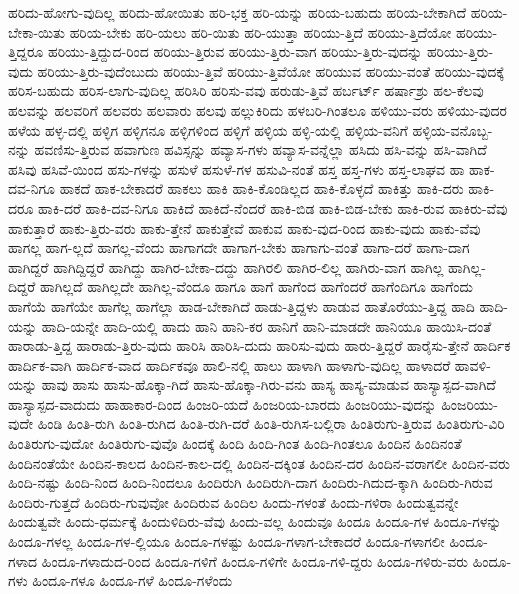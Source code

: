 {ಹರಿದು-ಹೋಗು-ವುದಿಲ್ಲ
ಹರಿದು-ಹೋಯಿತು
ಹರಿ-ಭಕ್ತ
ಹರಿ-ಯನ್ನು
ಹರಿಯ-ಬಹುದು
ಹರಿಯ-ಬೇಕಾಗಿದೆ
ಹರಿಯ-ಬೇಕಾ-ಯಿತು
ಹರಿಯ-ಬೇಕು
ಹರಿ-ಯಲು
ಹರಿ-ಯಿತು
ಹರಿ-ಯುತ್ತಾ
ಹರಿಯು-ತ್ತಿದೆ
ಹರಿಯು-ತ್ತಿದೆಯೋ
ಹರಿಯು-ತ್ತಿದ್ದರೂ
ಹರಿಯು-ತ್ತಿದ್ದುದ-ರಿಂದ
ಹರಿಯು-ತ್ತಿರುವ
ಹರಿಯು-ತ್ತಿರು-ವಾಗ
ಹರಿಯು-ತ್ತಿರು-ವುದನ್ನು
ಹರಿಯು-ತ್ತಿರು-ವುದು
ಹರಿಯು-ತ್ತಿರು-ವುದೆಂಬುದು
ಹರಿಯು-ತ್ತಿವೆ
ಹರಿಯು-ತ್ತಿವೆಯೋ
ಹರಿಯುವ
ಹರಿಯು-ವಂತೆ
ಹರಿಯು-ವುದಕ್ಕೆ
ಹರಿಸ-ಬಹುದು
ಹರಿಸ-ಲಾಗು-ವುದಿಲ್ಲ
ಹರಿಸಿರಿ
ಹರಿಸು-ವವು
ಹರುಡು-ತ್ತಿವೆ
ಹರ್ಬರ್ಟ್
ಹರ್ಷಾಶ್ರು
ಹಲ-ಕೆಲವು
ಹಲವನ್ನು
ಹಲವರಿಗೆ
ಹಲವರು
ಹಲವಾರು
ಹಲವು
ಹಲ್ಲುಕಿರಿದು
ಹಳಬರಿ-ಗಿಂತಲೂ
ಹಳಿಯು-ವರು
ಹಳಿಯು-ವುದರ
ಹಳೆಯ
ಹಳ್ಳ-ದಲ್ಲಿ
ಹಳ್ಳಿಗ
ಹಳ್ಳಿಗನೂ
ಹಳ್ಳಿಗಳಿಂದ
ಹಳ್ಳಿಗೆ
ಹಳ್ಳಿಯ
ಹಳ್ಳಿ-ಯಲ್ಲಿ
ಹಳ್ಳಿಯ-ವನಿಗೆ
ಹಳ್ಳಿಯ-ವನೊಬ್ಬ-ನನ್ನು
ಹವಣಿಸು-ತ್ತಿರುವ
ಹವಾಗುಣ
ಹವಿಸ್ಸನ್ನು
ಹವ್ಯಾಸ-ಗಳು
ಹವ್ಯಾಸ-ವನ್ನೆಲ್ಲಾ
ಹಸಿದು
ಹಸಿ-ವನ್ನು
ಹಸಿ-ವಾಗಿದೆ
ಹಸಿವು
ಹಸಿವೆ-ಯಿಂದ
ಹಸು-ಗಳನ್ನು
ಹಸುಳೆ
ಹಸುಳೆ-ಗಳ
ಹಸುವಿ-ನಂತೆ
ಹಸ್ತ
ಹಸ್ತ-ಗಳು
ಹಸ್ತ-ಲಾಘವ
ಹಾ
ಹಾಕ-ದವ-ನಿಗೂ
ಹಾಕದೆ
ಹಾಕ-ಬೇಕಾದರೆ
ಹಾಕಲು
ಹಾಕಿ
ಹಾಕಿ-ಕೊಂಡಿಲ್ಲದ
ಹಾಕಿ-ಕೊಳ್ಳದೆ
ಹಾಕಿತ್ತು
ಹಾಕಿ-ದರು
ಹಾಕಿ-ದರೂ
ಹಾಕಿ-ದರೆ
ಹಾಕಿ-ದವ-ನಿಗೂ
ಹಾಕಿದೆ
ಹಾಕಿದೆ-ನೆಂದರೆ
ಹಾಕಿ-ಬಿಡ
ಹಾಕಿ-ಬಿಡ-ಬೇಕು
ಹಾಕಿ-ರುವ
ಹಾಕಿರು-ವೆವು
ಹಾಕುತ್ತಾರೆ
ಹಾಕು-ತ್ತಿರು-ವರು
ಹಾಕು-ತ್ತೇನೆ
ಹಾಕುತ್ತೇವೆ
ಹಾಕುವ
ಹಾಕು-ವುದ-ರಿಂದ
ಹಾಕು-ವುದು
ಹಾಕು-ವೆವು
ಹಾಗಲ್ಲ
ಹಾಗ-ಲ್ಲದೆ
ಹಾಗಲ್ಲ-ವೆಂದು
ಹಾಗಾಗದೇ
ಹಾಗಾಗ-ಬೇಕು
ಹಾಗಾಗು-ವಂತೆ
ಹಾಗಾ-ದರೆ
ಹಾಗಾ-ದಾಗ
ಹಾಗಿದ್ದರೆ
ಹಾಗಿದ್ದಿದ್ದರೆ
ಹಾಗಿದ್ದು
ಹಾಗಿರ-ಬೇಕಾ-ದದ್ದು
ಹಾಗಿರಲಿ
ಹಾಗಿರ-ಲಿಲ್ಲ
ಹಾಗಿರು-ವಾಗ
ಹಾಗಿಲ್ಲ
ಹಾಗಿಲ್ಲ-ದಿದ್ದರೆ
ಹಾಗಿಲ್ಲದೆ
ಹಾಗಿಲ್ಲದೇ
ಹಾಗಿಲ್ಲ-ವೆಂದೂ
ಹಾಗೂ
ಹಾಗೆ
ಹಾಗೆಂದ
ಹಾಗೆಂದರೆ
ಹಾಗೆಂದಿಗೂ
ಹಾಗೆಂದು
ಹಾಗೆಯೆ
ಹಾಗೆಯೇ
ಹಾಗೆಲ್ಲ
ಹಾಗೆಲ್ಲಾ
ಹಾಡ-ಬೇಕಾಗಿದೆ
ಹಾಡು-ತ್ತಿದ್ದಳು
ಹಾಡುವ
ಹಾತೊರೆಯು-ತ್ತಿದ್ದ
ಹಾದಿ
ಹಾದಿ-ಯನ್ನು
ಹಾದಿ-ಯನ್ನೇ
ಹಾದಿ-ಯಲ್ಲಿ
ಹಾದು
ಹಾನಿ
ಹಾನಿ-ಕರ
ಹಾನಿಗೆ
ಹಾನಿ-ಮಾಡದೇ
ಹಾನಿಯೂ
ಹಾಯಿಸಿ-ದಂತೆ
ಹಾರಾಡು-ತ್ತಿದ್ದ
ಹಾರಾಡು-ತ್ತಿರು-ವುದು
ಹಾರಿಸಿ
ಹಾರಿಸಿ-ದುದು
ಹಾರಿಸು-ವುದು
ಹಾರು-ತ್ತಿದ್ದರೆ
ಹಾರೈಸು-ತ್ತೇನೆ
ಹಾರ್ದಿಕ
ಹಾರ್ದಿಕ-ವಾಗಿ
ಹಾರ್ದಿಕ-ವಾದ
ಹಾರ್ದಿಕವೂ
ಹಾಲಿ-ನಲ್ಲಿ
ಹಾಲು
ಹಾಳಾಗಿ
ಹಾಳಾಗು-ವುದಿಲ್ಲ
ಹಾಳಾದರೆ
ಹಾವಳಿ-ಯನ್ನು
ಹಾವು
ಹಾಸು
ಹಾಸು-ಹೊಕ್ಕಾ-ಗಿದೆ
ಹಾಸು-ಹೊಕ್ಕಾ-ಗಿರು-ವನು
ಹಾಸ್ಯ
ಹಾಸ್ಯ-ಮಾಡುವ
ಹಾಸ್ಯಾಸ್ಪದ-ವಾಗಿದೆ
ಹಾಸ್ಯಾಸ್ಪದ-ವಾದುದು
ಹಾಹಾಕಾರ-ದಿಂದ
ಹಿಂಜರಿ-ಯದೆ
ಹಿಂಜರಿಯ-ಬಾರದು
ಹಿಂಜರಿಯು-ವುದನ್ನು
ಹಿಂಜರಿಯು-ವುದೇ
ಹಿಂಡಿ
ಹಿಂತಿ-ರುಗಿ
ಹಿಂತಿ-ರುಗಿದ
ಹಿಂತಿ-ರುಗಿ-ದರೆ
ಹಿಂತಿ-ರುಗಿಸ-ಬಲ್ಲಿರಾ
ಹಿಂತಿರುಗು-ತ್ತಿರುವ
ಹಿಂತಿರುಗು-ವಿರಿ
ಹಿಂತಿರುಗು-ವುದೋ
ಹಿಂತಿರುಗು-ವುವೊ
ಹಿಂದಕ್ಕೆ
ಹಿಂದಿ
ಹಿಂದಿ-ಗಿಂತ
ಹಿಂದಿ-ಗಿಂತಲೂ
ಹಿಂದಿನ
ಹಿಂದಿನಂತೆ
ಹಿಂದಿನಂತೆಯೇ
ಹಿಂದಿನ-ಕಾಲದ
ಹಿಂದಿನ-ಕಾಲ-ದಲ್ಲಿ
ಹಿಂದಿನ-ದಕ್ಕಿಂತ
ಹಿಂದಿನ-ದರ
ಹಿಂದಿನ-ವರಾಗಲೀ
ಹಿಂದಿನ-ವರು
ಹಿಂದಿ-ನಷ್ಟು
ಹಿಂದಿ-ನಿಂದ
ಹಿಂದಿ-ನಿಂದಲೂ
ಹಿಂದಿರುಗಿ
ಹಿಂದಿರುಗಿ-ದಾಗ
ಹಿಂದಿರು-ಗಿದುದ-ಕ್ಕಾಗಿ
ಹಿಂದಿರು-ಗಿರುವ
ಹಿಂದಿರು-ಗುತ್ತದೆ
ಹಿಂದಿರು-ಗುವುವೋ
ಹಿಂದಿರುವ
ಹಿಂದಿಲ
ಹಿಂದು-ಗಳಂತೆ
ಹಿಂದು-ಗಳಿರಾ
ಹಿಂದುತ್ವವನ್ನೇ
ಹಿಂದುತ್ವವೇ
ಹಿಂದು-ಧರ್ಮಕ್ಕೆ
ಹಿಂದುಳಿದಿರು-ವೆವು
ಹಿಂದು-ವಲ್ಲ
ಹಿಂದುವೂ
ಹಿಂದೂ
ಹಿಂದೂ-ಗಳ
ಹಿಂದೂ-ಗಳನ್ನು
ಹಿಂದೂ-ಗಳಲ್ಲ
ಹಿಂದೂ-ಗಳ-ಲ್ಲಿಯೂ
ಹಿಂದೂ-ಗಳಷ್ಟು
ಹಿಂದೂ-ಗಳಾಗ-ಬೇಕಾದರೆ
ಹಿಂದೂ-ಗಳಾಗಲೀ
ಹಿಂದೂ-ಗಳಾದ
ಹಿಂದೂ-ಗಳಾದುದ-ರಿಂದ
ಹಿಂದೂ-ಗಳಿಗೆ
ಹಿಂದೂ-ಗಳಿಗೇ
ಹಿಂದೂ-ಗಳಿ-ದ್ದರು
ಹಿಂದೂ-ಗಳಿರು-ವರು
ಹಿಂದೂ-ಗಳು
ಹಿಂದೂ-ಗಳೂ
ಹಿಂದೂ-ಗಳೆ
ಹಿಂದೂ-ಗಳೆಂದು
}
